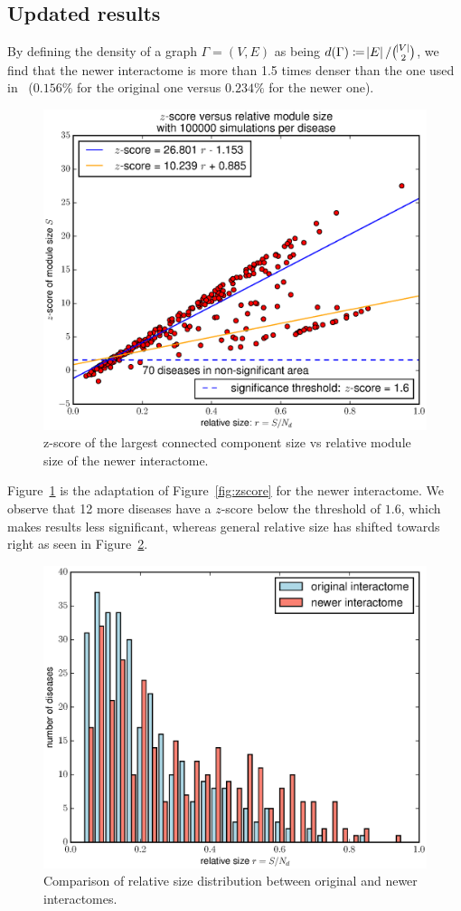 \documentclass[letterpaper]{article}
\begin{document}
	\subsection{Updated results}
	By defining the density of a graph $\Gamma = (V, E)$ as being $d(\Gamma) \coloneqq \abs E/\binom {\abs V}2$,
	we find that the newer interactome is more than 1.5 times denser than the one used in~\cite{originalPaper} ($0.156\%$
	for the original one versus $0.234\%$ for the newer one).

	\begin{figure}[!h]
		\includegraphics[width=.5\textwidth]{images/new_interactome_S4.b100000.eps}
		\caption{z-score of the largest connected component size vs relative module size of the newer interactome.
		\label{fig:new interactome zscore}}
	\end{figure}

	Figure~\ref{fig:new interactome zscore} is the adaptation of Figure~\ref{fig:zscore} for the newer interactome.
	We observe that 12 more diseases have a $z$-score below the threshold of $1.6$, which makes results less significant,
	whereas general relative size has shifted towards right as seen in Figure~\ref{fig:rel sizes comparison}.

	\begin{figure}[!h]
		\includegraphics[width=.5\textwidth]{images/rel_sizes_comparison.eps}
		\caption{Comparison of relative size distribution between original and newer interactomes.\label{fig:rel sizes comparison}}
	\end{figure}
\end{document}
